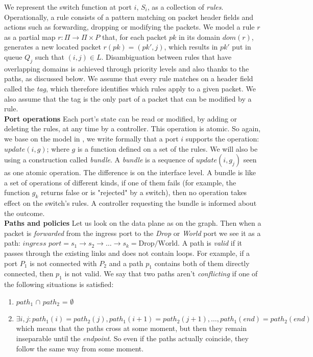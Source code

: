 \documentclass{article}
\theoremstyle{remark}
\begin{document}
We represent the switch function at port $i$, $S_i$, as a collection of \emph{rules}. Operationally, a rule consists of a pattern matching on packet header fields and actions such as forwarding, dropping or modifying the packets. We model a rule $r$ as a partial map $r:\Pi\rightarrow \Pi\times P$ that, for each packet $pk$ in its domain $\textit{dom}(r)$, generates a new located packet $r(pk)=(pk',j)$, which results in $pk'$ put in queue $Q_j$ such that $(i,j)\in L$. Disambiguation between rules that have overlapping domains is achieved through priority levels and also thanks to the paths, as discussed below. We assume that every rule matches on a header field called the \emph{tag}, which therefore identifies which rules apply to a given packet. We also assume that the tag is the only part of a packet that can be modified by a rule.\\
\textbf{Port operations} Each port's state can be read or modified, by adding or deleting the rules, at any time by a controller. This operation is atomic. So again, we base on the model in \cite{CKLS15}, we write formally that a port $i$ supports the operation: $update(i,g)$; where $g$ is a function defined on a set of the rules.
 We will also be using a construction called \emph{bundle}. A \emph{bundle} is a sequence of $update(i,g_j)$ seen as one atomic operation. The difference is on the interface level. A bundle is like a set of operations of different kinds, if one of them fails (for example, the function $g_k$ returns false or is "rejected" by a switch), then no operation takes effect on the switch's rules. A controller requesting the bundle is informed about the outcome.\\
\textbf{Paths and policies}
Let us look on the data plane as on the graph. Then when a packet is \emph{forwarded} from the ingress port to the \emph{Drop} or \emph{World} port we see it as a path: $\textit{ingress port} = s_1\rightarrow s_2 \rightarrow\ldots\rightarrow s_k = \text{Drop/World.}$ A path is \emph{valid} if it passes through the existing links and does not contain loops. For example, if a port $P_1$ is not connected with $P_2$ and a path $p_1$ contains both of them directly connected, then $p_1$ is not valid. 
We say that two paths aren't \emph{conflicting} if one of the following situations is satisfied:
    \begin{enumerate}
    \item \emph{$path_1$} $\cap$ \emph{$path_2$} = $\emptyset$
    \item $\exists i,j:path_1(i) = path_2(j), path_1(i+1) = path_2(j+1),\ldots, path_1(end)=path_2(end)$ which means that the paths cross at some moment, but then they remain inseparable until the \emph{endpoint}. So even if the paths actually coincide, they follow the same way from some moment.
    \end{enumerate}
\end{document}
